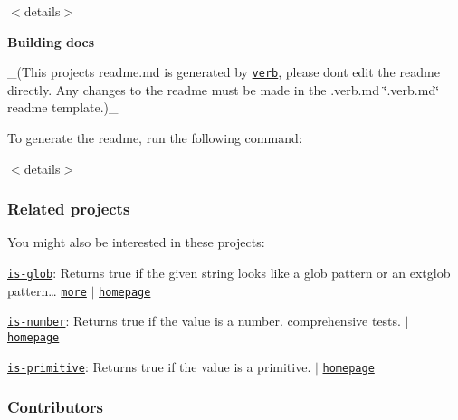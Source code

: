 $<$details$>$ 

{\bfseries Building docs}

\+\_\+(This project\textquotesingle{}s readme.\+md is generated by \href{https://github.com/verbose/verb-generate-readme}{\tt verb}, please don\textquotesingle{}t edit the readme directly. Any changes to the readme must be made in the .verb.\+md \char`\"{}.\+verb.\+md\char`\"{} readme template.)\+\_\+

To generate the readme, run the following command\+:




$<$details$>$

\subsubsection*{Related projects}

You might also be interested in these projects\+:


\begin{DoxyItemize}
\item \href{https://www.npmjs.com/package/is-glob}{\tt is-\/glob}\+: Returns {\ttfamily true} if the given string looks like a glob pattern or an extglob pattern… \href{https://github.com/jonschlinkert/is-glob}{\tt more} $\vert$ \href{https://github.com/jonschlinkert/is-glob}{\tt homepage}
\item \href{https://www.npmjs.com/package/is-number}{\tt is-\/number}\+: Returns true if the value is a number. comprehensive tests. $\vert$ \href{https://github.com/jonschlinkert/is-number}{\tt homepage}
\item \href{https://www.npmjs.com/package/is-primitive}{\tt is-\/primitive}\+: Returns {\ttfamily true} if the value is a primitive. $\vert$ \href{https://github.com/jonschlinkert/is-primitive}{\tt homepage}
\end{DoxyItemize}

\subsubsection*{Contributors}

